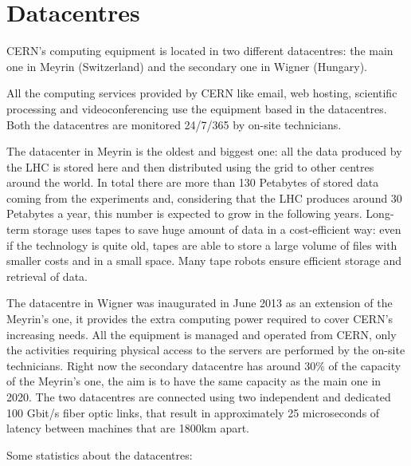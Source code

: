 \section{Datacentres}

CERN's computing equipment is located in two different datacentres: the
main one in Meyrin (Switzerland) and the secondary one in Wigner
(Hungary).

All the computing services provided by CERN like email, web hosting,
scientific processing and videoconferencing use the equipment based in the
datacentres. Both the datacentres are monitored 24/7/365 by on-site
technicians.

The datacenter in Meyrin is the oldest and biggest one: all the data
produced by the LHC is stored here and then distributed using the grid to
other centres around the world. In total there are more than 130 Petabytes
of stored data coming from the experiments and, considering that the LHC
produces around 30 Petabytes a year, this number is expected to grow in
the following years. Long-term storage uses tapes to save huge amount of
data in a cost-efficient way: even if the technology is quite old, tapes
are able to store a large volume of files with smaller costs and in
a small space. Many tape robots ensure efficient storage and retrieval of
data.

The datacentre in Wigner was inaugurated in June 2013 as an extension of
the Meyrin's one, it provides the extra computing power required to cover
CERN's increasing needs. All the equipment is managed and operated from
CERN, only the activities requiring physical access to the servers are
performed by the on-site technicians. Right now the secondary datacentre
has around 30\% of the capacity of the Meyrin's one, the aim is to have
the same capacity as the main one in 2020. The two datacentres are
connected using two independent and dedicated 100 Gbit/s fiber optic
links, that result in approximately 25 microseconds of latency between
machines that are 1800km apart.

Some statistics about the datacentres:

